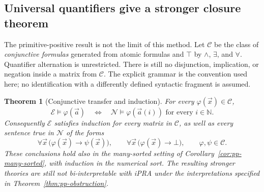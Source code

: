 \documentclass[11pt,letterpaper]{article}
\newtheorem{theorem}{Theorem}[section]
\theoremstyle{definition}\newtheorem{definition}[theorem]{Definition}
\theoremstyle{remark}\newtheorem{remark}[theorem]{Remark}
\begin{document}
\subsection{Universal quantifiers give a stronger closure theorem}

The primitive-positive result is not the limit of this method.  Let
$\mathcal C$ be the class of \emph{conjunctive formulas} generated from
atomic formulas and $\top$ by $\wedge$, $\exists$, and $\forall$.
Quantifier alternation is unrestricted.  There is still no disjunction,
implication, or negation inside a matrix from $\mathcal C$.
The explicit grammar is the convention used here; no identification
with a differently defined syntactic fragment is assumed.

\begin{theorem}[Conjunctive transfer and induction]
\label{thm:conjunctive-induction}
For every $\varphi(\vec x)\in\mathcal C$,
\[
 \mathcal E\models\varphi(\vec a)
 \quad\Longleftrightarrow\quad
 \mathcal N\models\varphi(\vec a(i))
                  \text{ for every }i\in\mathbb N.
\]
Consequently $\mathcal E$ satisfies induction for every matrix in
$\mathcal C$, as well as every sentence true in $\mathcal N$ of the
forms
\[
 \forall\vec x\,\bigl(\varphi(\vec x)\to\psi(\vec x)\bigr),
 \qquad
 \forall\vec x\,\bigl(\varphi(\vec x)\to\bot\bigr),
 \qquad \varphi,\psi\in\mathcal C.
\]
These conclusions hold also in the many-sorted setting of
Corollary~\ref{cor:pp-many-sorted}, with induction in the numerical
sort.  The resulting stronger theories are still not bi-interpretable
with iPRA under the interpretations specified in
Theorem~\ref{thm:pp-obstruction}.
\end{theorem}
\end{document}
